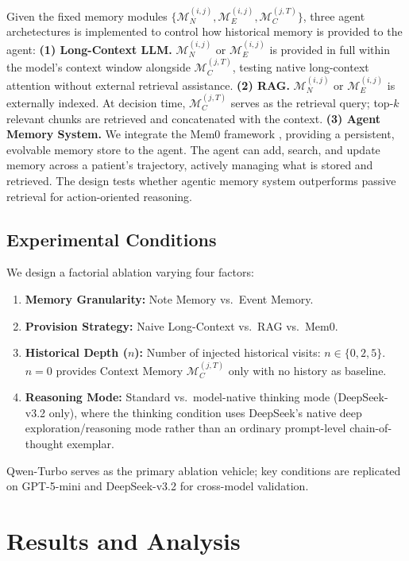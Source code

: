 Given the fixed memory modules $\{\mathcal{M}^{(i,j)}_N, \mathcal{M}^{(i,j)}_E, \mathcal{M}_C^{(j,T)}\}$, three agent archetectures is implemented to control how historical memory is provided to the agent: \textbf{(1) Long-Context LLM.} $\mathcal{M}^{(i,j)}_N$ or $\mathcal{M}^{(i,j)}_E$ is provided in full within the model's context window alongside $\mathcal{M}_C^{(j,T)}$, testing native long-context attention without external retrieval assistance. \textbf{(2) RAG.} $\mathcal{M}^{(i,j)}_N$ or $\mathcal{M}^{(i,j)}_E$ is externally indexed. At decision time, $\mathcal{M}_C^{(j,T)}$ serves as the retrieval query; top-$k$ relevant chunks are retrieved and concatenated with the context. \textbf{(3) Agent Memory System.} We integrate the Mem0 framework \cite{mem0_reference}, providing a persistent, evolvable memory store to the agent. The agent can add, search, and update memory across a patient's trajectory, actively managing what is stored and retrieved. The design tests whether agentic memory system outperforms passive retrieval for action-oriented reasoning.

\subsection{Experimental Conditions}

We design a factorial ablation varying four factors:

\begin{enumerate}
    \item \textbf{Memory Granularity:} Note Memory vs.\ Event Memory.
    \item \textbf{Provision Strategy:} Naive Long-Context vs.\ RAG vs.\ Mem0.
    \item \textbf{Historical Depth ($n$):} Number of injected historical visits: $n \in \{0, 2, 5\}$. $n=0$ provides Context Memory $\mathcal{M}_C^{(j,T)}$ only with no history as baseline.
    \item \textbf{Reasoning Mode:} Standard vs.\ model-native thinking mode (DeepSeek-v3.2 only), where the thinking condition uses DeepSeek's native deep exploration/reasoning mode rather than an ordinary prompt-level chain-of-thought exemplar.
\end{enumerate}

Qwen-Turbo serves as the primary ablation vehicle; key conditions are replicated on GPT-5-mini and DeepSeek-v3.2 for cross-model validation.

\section{Results and Analysis}
\label{sec:results}

